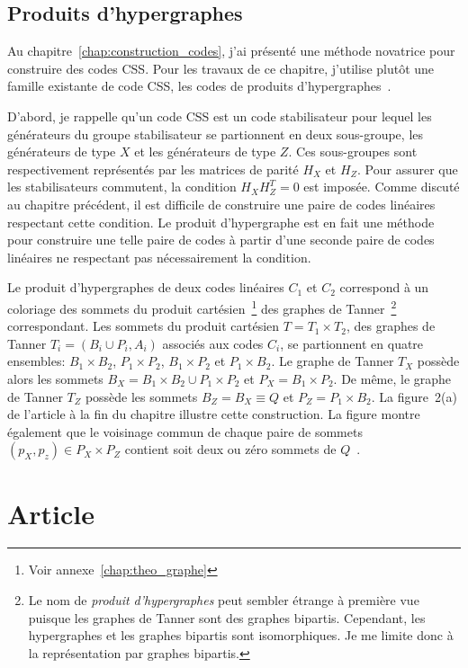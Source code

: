 \subsection{Produits d'hypergraphes}

Au chapitre~\ref{chap:construction_codes},
j'ai présenté une méthode novatrice pour construire des codes CSS.
Pour les travaux de ce chapitre,
j'utilise plutôt une famille existante de code CSS,
les codes de produits d'hypergraphes~\cite{tillich_quantum_2014}.

D'abord,
je rappelle qu'un code CSS est un code stabilisateur pour lequel les générateurs du groupe
stabilisateur se partionnent en deux sous-groupe, 
les générateurs de type $X$ et les générateurs de type $Z$.
Ces sous-groupes sont respectivement représentés par les matrices de parité $H_X$ et $H_Z$.
Pour assurer que les stabilisateurs commutent,
la condition $H_X H_Z^T = 0$ est imposée.
Comme discuté au chapitre précédent,
il est difficile de construire une paire de codes linéaires
respectant cette condition.
Le produit d'hypergraphe est en fait une méthode pour construire
une telle paire de codes à partir d'une seconde paire de codes linéaires
ne respectant pas nécessairement la condition.

Le produit d'hypergraphes de deux codes linéaires $C_1$ et $C_2$
correspond à un coloriage des sommets du produit cartésien~\footnote{Voir annexe~\ref{chap:theo_graphe}}
des graphes de Tanner~\footnote{Le nom de \textit{produit d'hypergraphes} peut sembler étrange à première
vue puisque les graphes de Tanner sont des graphes bipartis. Cependant, les hypergraphes et les graphes
bipartis sont isomorphiques. Je me limite donc à la représentation par graphes bipartis.} correspondant.
Les sommets du produit cartésien $T = T_1 \times T_2$, 
des graphes de Tanner $T_i = (B_i \cup P_i, A_i)$ associés aux codes $C_i$,
se partionnent en quatre ensembles:
$B_1 \times B_2$, $P_1 \times P_2$, $B_1 \times P_2$ et $P_1 \times B_2$.
Le graphe de Tanner $T_X$ possède alors les sommets $B_X = B_1 \times B_2 \cup P_1 \times P_2$
et $P_X = B_1 \times P_2$.
De même,
le graphe de Tanner $T_Z$ possède les sommets $B_Z = B_X \equiv Q$
et $P_Z = P_1 \times B_2$.
La figure~2(a) de l'article à la fin du chapitre illustre cette construction.
La figure montre également que le voisinage commun de chaque paire de sommets
$(p_X, p_z) \in P_X \times P_Z$ contient soit deux ou zéro sommets de $Q$~\cite{tillich_quantum_2014}.






 

\section{Article}



